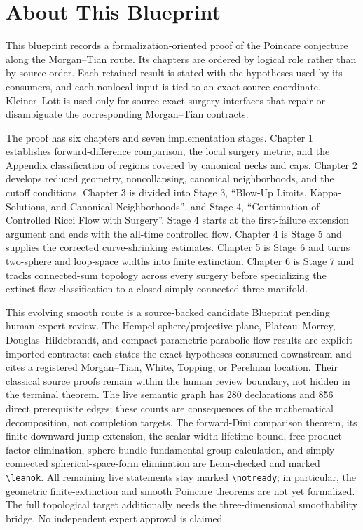 

\chapter*{About This Blueprint}

This blueprint records a formalization-oriented proof of the Poincare
conjecture along the Morgan--Tian route.  Its chapters are ordered by logical
role rather than by source order.  Each retained result is stated with the
hypotheses used by its consumers, and each nonlocal input is tied to an exact
source coordinate.  Kleiner--Lott is used only for source-exact surgery
interfaces that repair or disambiguate the corresponding Morgan--Tian
contracts.

The proof has six chapters and seven implementation stages.  Chapter 1
establishes forward-difference comparison, the local surgery metric, and the
Appendix classification of regions covered by canonical necks and caps.
Chapter 2 develops reduced geometry, noncollapsing, canonical neighborhoods,
and the cutoff conditions.  Chapter 3 is divided into Stage 3, ``Blow-Up
Limits, Kappa-Solutions, and Canonical Neighborhoods'', and Stage 4,
``Continuation of Controlled Ricci Flow with Surgery''.  Stage 4 starts at the
first-failure extension argument and ends with the all-time controlled flow.
Chapter 4 is Stage 5 and supplies the corrected curve-shrinking estimates.
Chapter 5 is Stage 6 and turns two-sphere and loop-space widths into finite
extinction.  Chapter 6 is Stage 7 and tracks connected-sum topology across
every surgery before specializing the extinct-flow classification to a closed
simply connected three-manifold.

This evolving smooth route is a source-backed candidate
Blueprint pending human expert review.  The Hempel sphere/projective-plane,
Plateau--Morrey, Douglas--Hildebrandt, and compact-parametric parabolic-flow
results are explicit imported contracts: each states the exact hypotheses
consumed downstream and cites a registered Morgan--Tian, White, Topping, or
Perelman location.  Their classical source proofs remain within the human
review boundary, not hidden in the terminal theorem.  The live semantic graph
has 280 declarations and 856 direct prerequisite edges; these counts are
consequences of the mathematical decomposition, not completion targets.
The forward-Dini comparison theorem, its finite-downward-jump extension,
the scalar width lifetime bound, free-product factor elimination,
sphere-bundle fundamental-group calculation, and simply connected
spherical-space-form elimination are Lean-checked and marked \verb|\leanok|.
All remaining live statements stay marked \verb|\notready|; in particular,
the geometric finite-extinction and smooth Poincare theorems are not yet
formalized. The full topological target additionally needs the
three-dimensional smoothability bridge. No independent expert approval is claimed.












